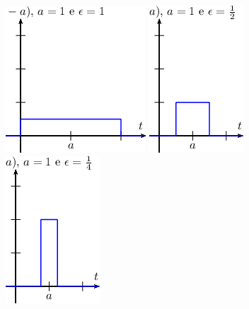 \documentclass[a4paper,10pt]{book}
\begin{document}
 \begin{figure}[!ht]
 \begin{center}
% 
 \includegraphics{figs/figura_1}\hspace{20pt}
 \includegraphics{figs/figura_2}\hspace{20pt}
 \includegraphics{figs/figura_3}
 

\end{center}
\end{figure}
\end{document}
